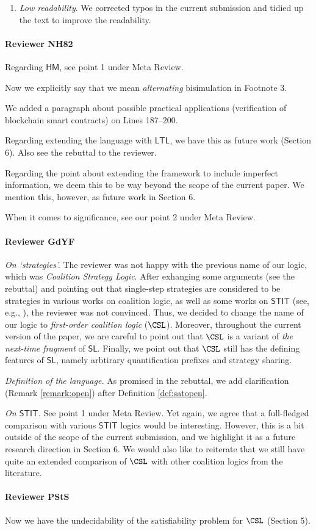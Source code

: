 \begin{enumerate}
    \item \textit{Low readability}. We corrected typos in the current submission and tidied up the text to improve the readability. 
\end{enumerate}

\paragraph{Reviewer NH82}
Regarding $\mathsf{HM}$, see point 1 under Meta Review.

Now we explicitly say that we mean \textit{alternating} bisimulation in Footnote 3.

We added a paragraph about possible practical applications (verification of blockchain smart contracts) on Lines 187--200.

Regarding extending the language with $\mathsf{LTL}$, we have this as future work (Section 6). Also see the rebuttal to the reviewer.

Regarding the point about extending the framework to include imperfect information, we deem this to be way beyond the scope of the current paper. We mention this, however, as future work in Section 6.

When it comes to significance, see our point 2 under Meta Review.

\paragraph{Reviewer GdYF}
\textit{On `strategies'.} The reviewer was not happy with the previous name of our logic, which was \textit{Coalition Strategy Logic}. After exhanging some arguments (see the rebuttal) and pointing out that single-step strategies are considered to be strategies in various works on coalition logic, as well as some works on $\mathsf{STIT}$ (see, e.g., \cite{broersen15}), the reviewer was not convinced. Thus, we decided to change the name of our logic to \textit{first-order coalition logic} ($\CSL$). Moreover, throughout the current version of the paper, we are careful to point out that $\CSL$ is a variant of \textit{the next-time fragment} of $\mathsf{SL}$. Finally, we point out that $\CSL$ still has the defining features of $\mathsf{SL}$, namely arbtirary quantification prefixes and strategy sharing.

\textit{Definition of the language.} As promised in the rebuttal, we add clarification (Remark \ref{remark:open}) after Definition \ref{def:satopen}. 

\textit{On $\mathsf{STIT}$.} See point 1 under Meta Review. Yet again, we agree that a full-fledged comparison with various $\mathsf{STIT}$ logics would be interesting. However, this is a bit outside of the scope of the current submission, and we highlight it as a future research direction in Section 6. We would also like to reiterate that we still have quite an extended comparison of $\CSL$ with other coalition logics from the literature. 


\paragraph{Reviewer PStS}
Now we have the undecidability of the satisfiability problem for $\CSL$ (Section 5).

